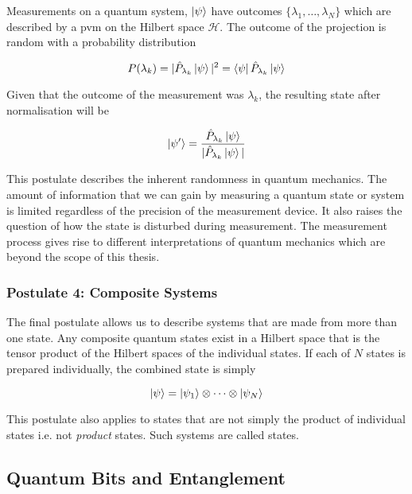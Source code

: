 Measurements on a quantum system, $\ket{\psi}$ have outcomes $\{\lambda_1, \ldots, \lambda_N\}$ which are described by a \ac{pvm} on the Hilbert space $\mathcal{H}$. The outcome of the projection is random with a probability distribution

\begin{equation}
	P(\lambda_k) = |\hat{P}_{\lambda_k}\ket{\psi}|^2 = \bra{\psi}\hat{P}_{\lambda_k}\ket{\psi}
\end{equation}

Given that the outcome of the measurement was $\lambda_k$, the resulting state after normalisation will be

\begin{equation}
	\ket{\psi'} = \frac{\hat{P}_{\lambda_k}\ket{\psi}}{|\hat{P}_{\lambda_k}\ket{\psi}|}
\end{equation}

This postulate describes the inherent randomness in quantum mechanics. The amount of information that we can gain by measuring a quantum state or system is limited regardless of the precision of the measurement device. It also raises the question of how the state is disturbed during measurement. The measurement process gives rise to different interpretations of quantum mechanics which are beyond the scope of this thesis.


\subsubsection*{Postulate 4: Composite Systems}

The final postulate allows us to describe systems that are made from more than one state. Any composite quantum states exist in a Hilbert space that is the tensor product of the Hilbert spaces of the individual states. If each of $N$ states is prepared individually, the combined state is simply

\begin{equation}
	\ket{\psi} = \ket{\psi_1}\otimes\cdots\otimes\ket{\psi_N}
\end{equation}

This postulate also applies to states that are not simply the product of individual states i.e. not \emph{product} states. Such systems are called  states.

\subsection{Quantum Bits and Entanglement}

